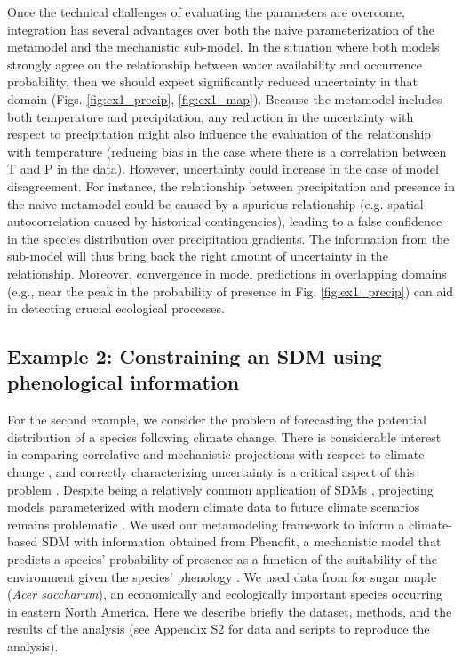 \documentclass[11pt]{article}
\begin{document}
Once the technical challenges of evaluating the parameters are overcome, integration has several advantages over both the naive parameterization of the metamodel and the mechanistic sub-model. 
In the situation where both models strongly agree on the relationship between water availability and occurrence probability, then we should expect significantly reduced uncertainty in that domain (Figs. \ref{fig:ex1_precip}, \ref{fig:ex1_map}).
Because the metamodel includes both temperature and precipitation, any reduction in the uncertainty with respect to precipitation might also influence the evaluation of the relationship with temperature (reducing bias in the case where there is a correlation between T and P in the data). 
However, uncertainty could increase in the case of model disagreement.
For instance, the relationship between precipitation and presence in the naive metamodel could be caused by a spurious relationship (e.g. spatial autocorrelation caused by historical contingencies), leading to a false confidence in the species distribution over precipitation gradients. 
The information from the sub-model will thus bring back the right amount of uncertainty in the relationship.
Moreover, convergence in model predictions in overlapping domains (e.g., near the peak in the probability of presence in Fig. \ref{fig:ex1_precip}) can aid in detecting crucial ecological processes.



%
%


\subsection*{Example 2: Constraining an SDM using phenological information}
For the second example, we consider the problem of forecasting the potential distribution of a species following climate change.
There is considerable interest in comparing correlative and mechanistic projections with respect to climate change \citep{Morin2009}, and correctly characterizing uncertainty is a critical aspect of this problem \citep{Cheaib2012}.
Despite being a relatively common application of \ac{SDM}s \citep{Guisan2005}, projecting models parameterized with modern climate data to future climate scenarios remains problematic \citep{Araujo2006}.
We used our metamodeling framework to inform a climate-based SDM with information obtained from Phenofit, a mechanistic model that predicts a species' probability of presence as a function of the suitability of the environment given the species' phenology \citep{Chuine2001, Morin2009}.
We used data from \citet{Morin2009} for sugar maple (\emph{Acer saccharum}), an economically and ecologically important species occurring in eastern North America.
Here we describe briefly the dataset, methods, and the results of the analysis (see Appendix S2 for data and scripts to reproduce the analysis).
\end{document}
